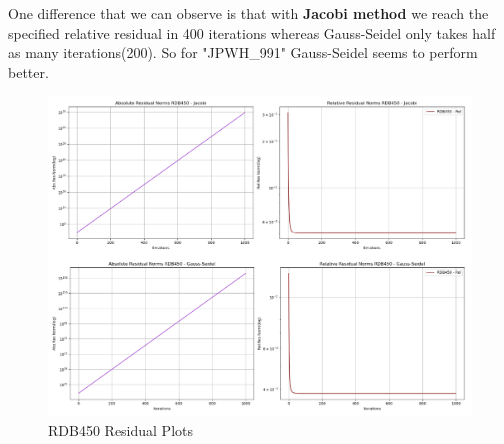 \documentclass{article}
\begin{document}
    One difference that we can observe is that with \textbf{Jacobi method} we reach the specified relative residual in 400 iterations whereas Gauss-Seidel only takes half as many iterations(200). So for "JPWH\_991" Gauss-Seidel seems to perform better. 
\begin{figure}[h!]
    \centering
    \includegraphics[width=1\linewidth]{rdb450_res_plot.PNG}
    \caption{RDB450 Residual Plots}
\end{figure}
\end{document}
